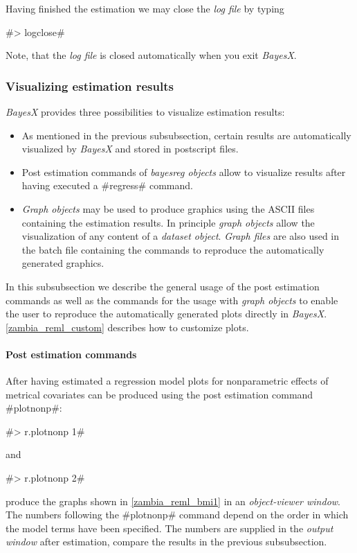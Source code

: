 Having finished the estimation we may close the {\it log file} by
typing

#> logclose#

Note, that the {\it log file} is closed automatically when you
exit {\em BayesX}.

\subsubsection{Visualizing estimation results}\label{zambia_reml_visual}

{\em BayesX} provides three possibilities to visualize estimation
results:
\begin{itemize}
\item As mentioned in the previous subsubsection, certain results are
automatically visualized by {\em BayesX} and stored in postscript
files.
\item Post estimation commands of {\em bayesreg objects} allow to
visualize results after having executed a #regress# command.
\item {\em Graph objects} may be used to produce graphics using the ASCII files containing the estimation results.
In principle {\em graph objects} allow the visualization of any
content of a {\em dataset object}. {\em Graph files} are also used
in the batch file containing the commands to reproduce the
automatically generated graphics.
\end{itemize}

In this subsubsection we describe the general usage of the post
estimation commands as well as the commands for the usage with
{\em graph objects} to enable the user to reproduce the
automatically generated plots directly in {\em BayesX}.
\autoref{zambia_reml_custom} describes how to customize plots.

\paragraph{Post estimation commands}

After having estimated a regression model plots for nonparametric
effects of metrical covariates can be produced using the post
estimation command #plotnonp#:

#> r.plotnonp 1#

and

#> r.plotnonp 2#

produce the graphs shown in \autoref{zambia_reml_bmi1} in an {\it
object-viewer window}. The numbers following the #plotnonp#
command depend on the order in which the model terms have been
specified. The numbers are supplied in the {\em output window}
after estimation, compare the results in the previous
subsubsection.

